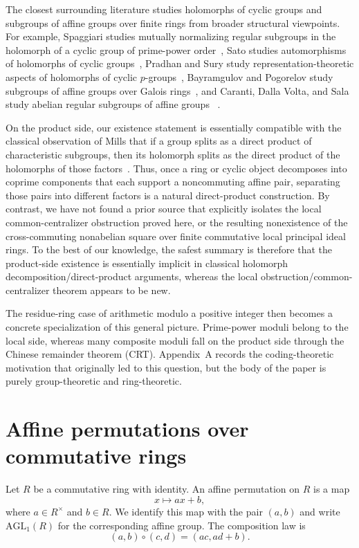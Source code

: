 \documentclass[11pt]{article}
\newcommand{\AGL}{\mathrm{AGL}_1}
\theoremstyle{uprightthm}
\begin{document}
The closest surrounding literature studies holomorphs of cyclic groups and
subgroups of affine groups over finite rings from broader structural viewpoints.
For example, Spaggiari studies mutually normalizing regular subgroups in the
holomorph of a cyclic group of prime-power order~\cite{Spaggiari2023}, Sato
studies automorphisms of holomorphs of cyclic groups~\cite{Sato2024Holomorph},
Pradhan and Sury study representation-theoretic aspects of holomorphs of cyclic
$p$-groups~\cite{PradhanSury2022}, Bayramgulov and Pogorelov study subgroups of
affine groups over Galois rings~\cite{BayramgulovPogorelov2024}, and Caranti,
Dalla Volta, and Sala study abelian regular subgroups of affine groups
~\cite{CarantiDallaVoltaSala2006}.

On the product side, our existence statement is essentially compatible with the
classical observation of Mills that if a group splits as a direct product of
characteristic subgroups, then its holomorph splits as the direct product of
the holomorphs of those factors~\cite{Mills1961}. Thus, once a ring or cyclic
object decomposes into coprime components that each support a noncommuting
affine pair, separating those pairs into different factors is a natural
direct-product construction. By contrast, we have not found a prior source
that explicitly isolates the local
common-centralizer obstruction proved here, or the resulting nonexistence of
the cross-commuting nonabelian square over finite commutative local principal
ideal rings. To the best of our knowledge, the safest summary is therefore
that the product-side existence is essentially implicit in classical holomorph
decomposition/direct-product arguments, whereas the local
obstruction/common-centralizer theorem appears to be new.

The residue-ring case of arithmetic modulo a positive integer then becomes a
concrete specialization of this general picture. Prime-power moduli belong to
the local side, whereas many composite moduli fall on the product side through
the Chinese remainder theorem (CRT). Appendix~A records the coding-theoretic
motivation that originally led to this question, but the body of the paper is
purely group-theoretic and ring-theoretic.

\section{Affine permutations over commutative rings}
Let $R$ be a commutative ring with identity. An affine permutation on $R$ is a
map
\[
x\longmapsto ax+b,
\]
where $a\in R^\times$ and $b\in R$. We identify this map with the pair $(a,b)$
and write $\AGL(R)$ for the corresponding affine group. The composition law is
\[
(a,b)\circ(c,d)=(ac,ad+b).
\]
\end{document}
